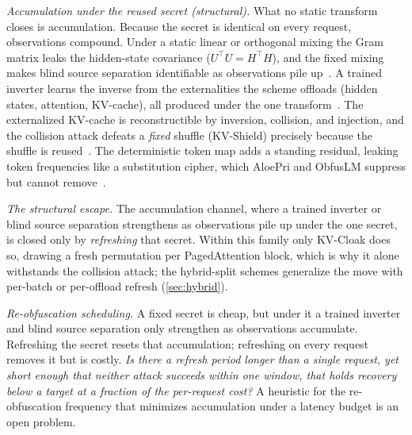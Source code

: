 \emph{Accumulation under the reused secret (structural).} What no static transform closes is
accumulation. Because the secret is identical on every request, observations compound. Under a
static linear or orthogonal mixing the Gram matrix leaks the hidden-state covariance
($U^{\top}U{=}H^{\top}H$), and the fixed mixing makes blind source separation identifiable as
observations pile up~\citep{belikov_gelo,hyvarinen_ica,cardoso_jade}. A trained inverter learns the
inverse from the externalities the scheme offloads (hidden states, attention, KV-cache), all
produced under the one transform~\citep{geia,vec2text,depth_false_privacy}. The externalized
KV-cache is reconstructible by inversion, collision, and injection, and the collision attack defeats
a \emph{fixed} shuffle (KV-Shield) precisely because the shuffle is reused~\citep{luo_shadowcache}.
The deterministic token map adds a standing residual, leaking token frequencies like a substitution
cipher, which AloePri and ObfusLM suppress but cannot remove~\citep{lin_aloepri,obfuslm}.

\emph{The structural escape.} The accumulation channel, where a trained inverter or blind source
separation strengthens as observations pile up under the one secret, is closed only by
\emph{refreshing} that secret. Within this family only KV-Cloak does so, drawing a fresh permutation
per PagedAttention block, which is why it alone withstands the collision attack; the hybrid-split
schemes generalize the move with per-batch or per-offload refresh (\cref{sec:hybrid}).

\begin{openproblem}
\emph{Re-obfuscation scheduling.} A fixed secret is cheap, but under it a trained inverter and blind source separation only strengthen
as observations accumulate. Refreshing the secret resets that accumulation; refreshing on every
request removes it but is costly. \emph{Is there a refresh
period longer than a single request, yet short enough that neither attack succeeds within one
window, that holds recovery below a target at a fraction of the per-request cost?} A heuristic for the
re-obfuscation frequency that minimizes accumulation under a latency budget is an open problem.
\label{op:refresh-frequency}
\end{openproblem}
